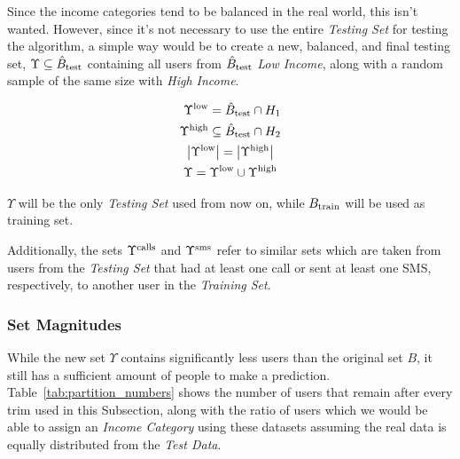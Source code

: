 Since the income categories tend to be balanced in the real world, this isn't wanted. However, since it's not necessary to use the entire \emph{Testing Set} for testing the algorithm, a simple way would be to create a new, balanced, and final testing set, $\Upsilon \subseteq \hat{B}_{\operatorname{test}}$ containing all users from $\hat{B}_{\operatorname{test}}$ \emph{Low Income}, along with a random sample of the same size with \emph{High Income}.

\begin{equation}
\label{eq:upsilon}
\begin{gathered}
\begin{aligned}
\Upsilon^{\operatorname{low}} &= \hat{B}_{\operatorname{test}} \cap H_1 \\
\Upsilon^{\operatorname{high}} &\subseteq \hat{B}_{\operatorname{test}} \cap H_2
\end{aligned} \\
\left| \Upsilon^{\operatorname{low}} \right| = \left| \Upsilon^{\operatorname{high}} \right| \\
\Upsilon = \Upsilon^{\operatorname{low}} \cup \Upsilon^{\operatorname{high}}
\end{gathered}
\end{equation}

$\Upsilon$ will be the only \emph{Testing Set} used from now on, while $B_{\operatorname{train}}$ will be used as training set.

Additionally, the sets $\Upsilon^{\operatorname{calls}}$ and $\Upsilon^{\operatorname{sms}}$ refer to similar sets which are taken from users from the \emph{Testing Set} that had at least one call or sent at least one SMS, respectively, to another user in the \emph{Training Set}.

\subsubsection{Set Magnitudes}

While the new set $\Upsilon$ contains significantly less users than the original set $B$, it still has a sufficient amount of people to make a prediction. Table~\ref{tab:partition_numbers} shows the number of users that remain after every trim used in this Subsection, along with the ratio of users which we would be able to assign an \emph{Income Category} using these datasets assuming the real data is equally distributed from the \emph{Test Data}.

